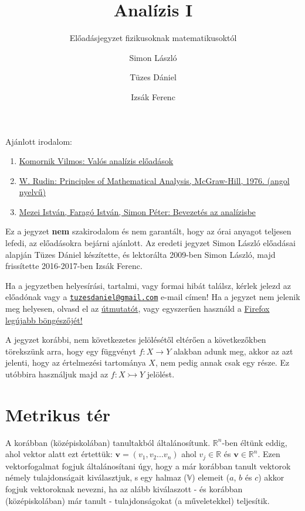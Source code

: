 \documentclass[]{scrartcl}
\subtitle{Előadásjegyzet fizikusoknak matematikusoktól}
\title{Analízis I}
\author{Simon László \and Tüzes Dániel \and Izsák Ferenc}
\date{}
\providecommand{\tightlist}{%
  \setlength{\itemsep}{0pt}\setlength{\parskip}{0pt}}
\begin{document}
\maketitle

{
\setcounter{tocdepth}{6}
\tableofcontents
}
Ajánlott irodalom:

\begin{enumerate}
\def\labelenumi{\arabic{enumi}.}
\tightlist
\item
  \href{http://www.typotex.hu/index.php?page=konyvek\&book_id=240}{Komornik
  Vilmos: Valós analízis előadások}
\item
  \href{https://notendur.hi.is/vae11/\%C3\%9Eekking/principles_of_mathematical_analysis_walter_rudin.pdf}{W.
  Rudin: Principles of Mathematical Analysis, McGraw-Hill, 1976. (angol
  nyelvű)}
\item
  \href{http://www.cs.elte.hu/\%7Esimonp/jegyzet1.pdf}{Mezei István,
  Faragó István, Simon Péter: Bevezetés az analízisbe}
\end{enumerate}

Ez a jegyzet \textbf{nem} szakirodalom és nem garantált, hogy az órai
anyagot teljesen lefedi, az előadásokra bejárni ajánlott. Az eredeti
jegyzet Simon László előadásai alapján Tüzes Dániel készítette, és
lektorálta 2009-ben Simon László, majd frissítette 2016-2017-ben Izsák
Ferenc.

Ha a jegyzetben helyesírási, tartalmi, vagy formai hibát találsz, kérlek
jelezd az előadónak vagy a
\href{mailto:tuzesdaniel@gmail.com}{\nolinkurl{tuzesdaniel@gmail.com}}
e-mail címen! Ha a jegyzet nem jelenik meg helyesen, olvasd el az
\href{http://fizweb.extra.hu/index.php?dir=kalkulus,analizis/analizisI/\&file=utmutato.html}{útmutatót},
vagy egyszerűen használd a
\href{http://www.mozilla.com/en-US/firefox/all.html}{Firefox legújabb
böngészőjét!}

A jegyzet korábbi, nem következetes jelölésétől eltérően a következőkben
törekszünk arra, hogy egy függvényt \(\left. f:X\rightarrow Y \right.\)
alakban adunk meg, akkor az azt jelenti, hogy az értelmezési tartománya
\(X\), nem pedig annak csak egy része. Ez utóbbira használjuk majd az
\(\left. f:X\rightarrowtail Y \right.\) jelölést.

\section{Metrikus tér}\label{metrikus-ter}

A korábban (középiskolában) tanultakból általánosítunk.
\({\mathbb{R}}^{n}\)-ben éltünk eddig, ahol vektor alatt ezt értettük:
\(\mathbf{v} = \left( {v_{1},v_{2}...v_{n}} \right)\) ahol
\(v_{j} \in {\mathbb{R}}\) és \(\mathbf{v} \in {\mathbb{R}}^{n}\). Ezen
vektorfogalmat fogjuk általánosítani úgy, hogy a már korábban tanult
vektorok némely tulajdonságait kiválasztjuk, s egy halmaz
(\(\mathbb{V}\)) elemeit (\(a\), \(b\) és \(c\)) akkor fogjuk
vektoroknak nevezni, ha az alább kiválaszott - és korábban
(középiskolában) már tanult - tulajdonságokat (a műveletekkel)
teljesítik.
\end{document}
